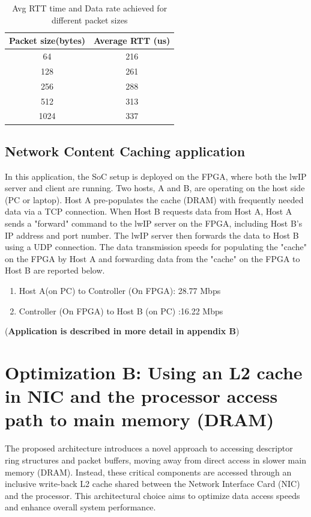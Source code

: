 \documentclass[12pt]{report}
\begin{document}
\begin{table}[h!]
\caption{Avg RTT time and Data rate achieved for different  packet sizes}
\begin{center}
\begin{tabular}{|c|c|}

\hline
\textbf{Packet size(bytes)} & \textbf{Average RTT (us)}  \\
\hline
64 & 216    \\
\hline
128 & 261   \\
\hline
256 & 288   \\
\hline
512 & 313   \\
\hline
1024 & 337   \\
\hline
\end{tabular}
\label{table_dataRate1}
\end{center}
\end{table}



\newpage
\subsection{Network Content Caching application}
In this application, the SoC setup is deployed on the FPGA, where both the lwIP server and client are running. Two hosts, A and B, are operating on the host side (PC or laptop). Host A pre-populates the cache (DRAM) with frequently needed data via a TCP connection. When Host B requests data from Host A, Host A sends a "forward" command to the lwIP server on the FPGA, including Host B's IP address and port number. The lwIP server then forwards the data to Host B using a UDP connection. The data transmission speeds for populating the "cache" on the FPGA by Host A and forwarding data from the "cache" on the FPGA to Host B are reported below.
\begin{enumerate}
    \item Host A(on PC) to Controller (On FPGA): 28.77 Mbps
    \item Controller (On FPGA) to Host B (on PC) :16.22 Mbps
\end{enumerate}

(\textbf{Application is described in more detail in appendix B})





\section{Optimization B: Using an L2 cache in NIC and the processor access path to main memory (DRAM)}
The proposed architecture introduces a novel approach to accessing descriptor ring structures and packet buffers, moving away from direct access in slower main memory (DRAM). Instead, these critical components are accessed through an inclusive write-back L2 cache shared between the Network Interface Card (NIC) and the processor. This architectural choice aims to optimize data access speeds and enhance overall system performance.
\end{document}
